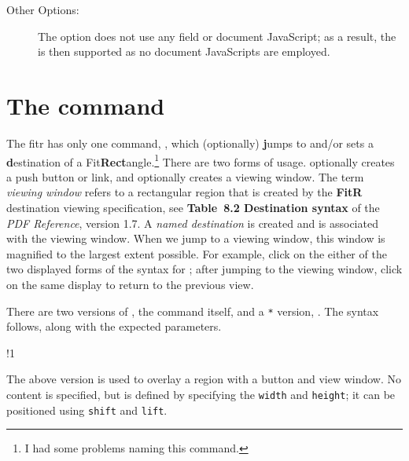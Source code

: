 \documentclass{article}
\let\tops\texorpdfstring
\newcommand{\FmtMP}[2][0pt]{\mbox{}\marginpar{\raisebox{#1}{\parbox{\marginparwidth}{\slshape\raggedleft\small#2}}}}
\def\meta#1{$\langle\textit{\texttt{#1}}\rangle$}
\def\fitrpkg{\textsf{f{i}tr}}
\let\texorpdfstring\tops
\begin{document}
\begin{description}
\item[Other Options:] The \FmtMP{\opt{gonative}} option does
    not use any field or document JavaScript; as a result, the
     is then supported as no document JavaScripts
    are employed.

\end{description}

\section{The \tops{\protect{}}{\textbackslash{jdRect}} command}\label{jdRect}

The {\fitrpkg} has only one command, , which (optionally)
\textbf{j}umps to and/\allowbreak or sets a \textbf{d}estination of a
\textsf{Fit\textbf{Rect}}angle.\footnote{I had some problems
naming this command.}
There are two forms of usage.  optionally
creates a push button or link, and optionally creates a viewing window. The
term \emph{viewing window} refers to a rectangular region that is created by
the \textbf{FitR} destination viewing specification, see \textbf{Table~8.2
Destination syntax} of the \textsl{PDF Reference}, version 1.7. A \emph{named
destination} is created and is associated with the viewing window. When we
jump to a viewing window, this window is magnified to the largest extent
possible. For example, click on the either of the two displayed forms of the
syntax for ; after jumping to the viewing window, click on the
same display to return to the previous view.

\newtopic\noindent
There are two versions of , the command itself, and a
\texttt{*} version, . The syntax follows, along with the
expected parameters.
\bVerb %
{}%
\setlength{\dimen0}{\bxSize}%
\def\1{\rlap{\hspace*{\dimen0}\sffamily(Click on box to zoom in)}}
\jdRect[width=\bxSize,height=1.5\baselineskip,lift=\baselineskip,adddestw=10bp,adddesth=10bp]\relax
\begin{dCmd}[commandchars=!()]{\bxSize}
!1
\end{dCmd}
\eVerb
The above version is used to overlay a region with a button and view
window. No content is specified, but is defined by specifying the
\texttt{width} and \texttt{height}; it can be positioned using
\texttt{shift} and \texttt{lift}.
\end{document}
